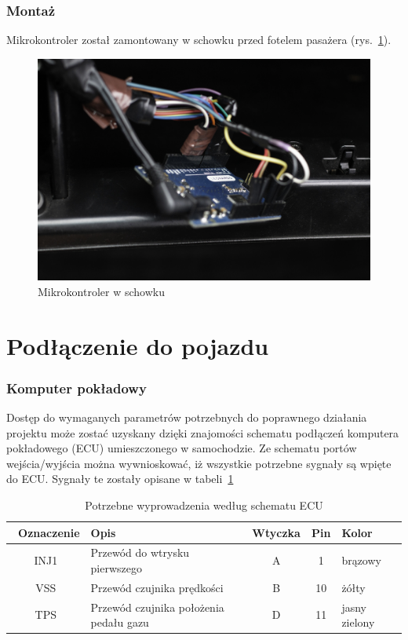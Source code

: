 \subsubsection{Montaż}
\par Mikrokontroler został zamontowany w schowku przed fotelem pasażera (rys.~\ref{fig:arduino_schowek}).

\begin{figure}[!htb]
\centering
\includegraphics[width=0.8\linewidth]{Rysunki/arduino_schowek.jpg}
\caption{Mikrokontroler w schowku}
\label{fig:arduino_schowek}
\end{figure}

\section{Podłączenie do pojazdu}
\subsubsection{Komputer pokładowy}
Dostęp do wymaganych parametrów potrzebnych do poprawnego działania projektu może zostać uzyskany dzięki znajomości schematu podłączeń komputera pokładowego (ECU) umieszczonego w samochodzie. Ze schematu portów wejścia/wyjścia\cite{HondaPinout} można wywnioskować, iż wszystkie potrzebne sygnały są wpięte do ECU. Sygnały te zostały opisane w tabeli~\ref{tab:ecu_pinout}

\begin{table}[htb] \small
\centering
\caption{Potrzebne wyprowadzenia według schematu ECU\cite{HondaPinout}}
\label{tab:ecu_pinout}
\begin{tabularx}{\linewidth}{|c|p{7cm}|c|c|X|} \hline\
\textbf{Oznaczenie} & \textbf{Opis} & \textbf{Wtyczka} &\textbf{ Pin} & \textbf{Kolor} \\ 
\hline
INJ1 & Przewód do wtrysku pierwszego & A & 1 & brązowy\\
\hline
VSS & Przewód czujnika prędkości & B & 10 & żółty\\
\hline
TPS & Przewód czujnika położenia pedału gazu & D & 11 & jasny zielony\\
\hline
\end{tabularx}
\end{table}

